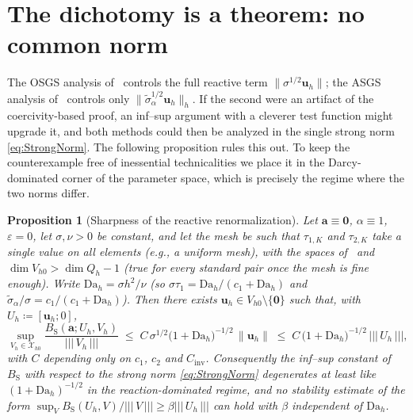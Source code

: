 \documentclass[11pt]{article}
\newtheorem{proposition}[theorem]{Proposition}
\theoremstyle{remark}
\newcommand{\bu}{\boldsymbol{u}}
\newcommand{\ba}{\boldsymbol{a}}
\newcommand{\norm}[1]{\lVert #1 \rVert}
\newcommand{\tnorm}[1]{\lvert\!\lvert\!\lvert\, #1 \,\rvert\!\rvert\!\rvert}
\newcommand{\Xhz}{\mathcal{X}_{h0}}
\newcommand{\st}{\widetilde{\sigma}_\alpha}
\newcommand{\Bs}{B_{\mathrm{S}}}
\begin{document}
\section{The dichotomy is a theorem: no common norm}
\label{sec:dichotomy}

The OSGS analysis of~\cite{OSGSnote} controls the full reactive term
$\norm{\sigma^{1/2}\bu_h}$; the ASGS analysis of~\cite{companion} controls only
$\norm{\st^{1/2}\bu_h}_h$. If the second were an artifact of the coercivity-based
proof, an inf--sup argument with a cleverer test function might upgrade it, and both
methods could then be analyzed in the single strong norm \cref{eq:StrongNorm}. The
following proposition rules this out. To keep the counterexample free of inessential
technicalities we place it in the Darcy-dominated corner of the parameter space,
which is precisely the regime where the two norms differ.

\begin{proposition}[Sharpness of the reactive renormalization]
\label{prop:negative}
Let $\ba \equiv \boldsymbol{0}$, $\alpha \equiv 1$, $\varepsilon = 0$, let
$\sigma, \nu > 0$ be constant, and let the mesh be such that $\tau_{1,K}$ and
$\tau_{2,K}$ take a single value on all elements (e.g., a uniform mesh), with the
spaces of~\cite{OSGSnote} and $\dim V_{h0} > \dim Q_h - 1$ (true for every standard
pair once the mesh is fine enough). Write $\mathrm{Da}_h = \sigma h^2/\nu$
(so $\sigma\tau_1 = \mathrm{Da}_h/(c_1 + \mathrm{Da}_h)$ and
$\st/\sigma = c_1/(c_1+\mathrm{Da}_h)$). Then there exists
$\bu_h \in V_{h0}\setminus\{\boldsymbol 0\}$ such that, with
$U_h \coloneqq [\bu_h; 0]$,
\begin{equation}
  \label{eq:NegativeBound}
  \sup_{V_h \in \Xhz}
  \frac{\Bs(\ba; U_h, V_h)}{\tnorm{V_h}}
  \;\le\;
  C\,\sigma^{1/2}\bigl(1 + \mathrm{Da}_h\bigr)^{-1/2}\,\norm{\bu_h}
  \;\le\;
  C\,\bigl(1 + \mathrm{Da}_h\bigr)^{-1/2}\,\tnorm{U_h},
\end{equation}
with $C$ depending only on $c_1$, $c_2$ and $C_{\mathrm{inv}}$. Consequently the
inf--sup constant of $\Bs$ with respect to the strong norm \cref{eq:StrongNorm}
degenerates at least like $(1+\mathrm{Da}_h)^{-1/2}$ in the reaction-dominated
regime, and no stability estimate of the form
$\sup_V \Bs(U_h,V)/\tnorm{V} \ge \beta\tnorm{U_h}$ can hold with $\beta$ independent
of $\mathrm{Da}_h$.
\end{proposition}
\end{document}
